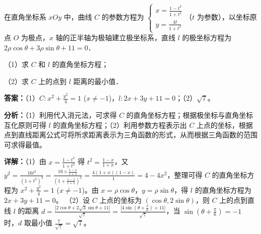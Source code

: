 \begin{question}[points=10]
在直角坐标系 $xOy$ 中，曲线 $C$ 的参数方程为 $\begin{cases} x = \frac{1-t^2}{1+t^2} \\ y = \frac{4t}{1+t^2} \end{cases}$（$t$ 为参数），以坐标原点 $O$ 为极点，$x$ 轴的正半轴为极轴建立极坐标系，直线 $l$ 的极坐标方程为 $2\rho\cos\theta + 3\rho\sin\theta + 11 = 0$．

（1）求 $C$ 和 $l$ 的直角坐标方程；

（2）求 $C$ 上的点到 $l$ 距离的最小值．
\begin{solution}
\textbf{答案：}（1）$C: x^2 + \frac{y^2}{4} = 1$ ($x \neq -1$)，$l: 2x+3y+11=0$；（2）$\sqrt{7}$。

\textbf{分析：}（1）利用代入消元法，可求得 $C$ 的直角坐标方程；根据极坐标与直角坐标互化原则可得 $l$ 的直角坐标方程；（2）利用参数方程表示出 $C$ 上点的坐标，根据点到直线距离公式可将所求距离表示为三角函数的形式，从而根据三角函数的范围可求得最值。

\textbf{详解：}（1）由 $x = \frac{1-t^2}{1+t^2}$ 得 $t^2 = \frac{1-x}{1+x}$，又 $y^2 = \frac{16t^2}{(1+t^2)^2} = \frac{16 \times \frac{1-x}{1+x}}{(1+\frac{1-x}{1+x})^2} = \frac{4(1+x)(1-x)}{1} = 4-4x^2$，整理可得 $C$ 的直角坐标方程为 $x^2 + \frac{y^2}{4} = 1$ ($x \neq -1$)。由 $x=\rho\cos\theta$，$y=\rho\sin\theta$，得 $l$ 的直角坐标方程为 $2x+3y+11=0$。
（2）设 $C$ 上点的坐标为 $(\cos\theta, 2\sin\theta)$，则 $C$ 上的点到直线 $l$ 的距离 $d = \frac{|2\cos\theta + 2\sqrt{3}\sin\theta + 11|}{\sqrt{7}} = \frac{|4\sin(\theta+\frac{\pi}{6}) + 11|}{\sqrt{7}}$，当 $\sin(\theta+\frac{\pi}{6}) = -1$ 时，$d$ 取最小值 $\frac{7}{\sqrt{7}} = \sqrt{7}$。
\end{solution}
\end{question}

